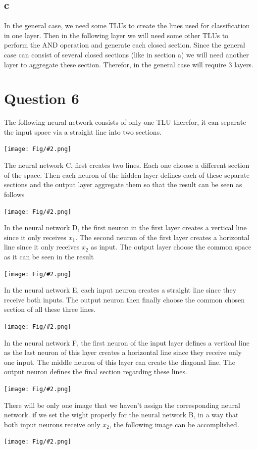 \documentclass[]{article}
\newcommand{\pict}[2]{\begin{center}
		\texttt{[image: Fig/\#2.png]}
\end{center}}
\begin{document}
	\subsection*{c}
	In the general case, we need some TLUs to create the lines used for classification in one layer. Then in the following layer we will need some other TLUs to perform the AND operation and generate each closed section. Since the general case can consist of several closed sections (like in section a) we will need another layer to aggregate these section. Therefor, in the general case will require 3 layers. 
	
	\section{Question 6}
	The following neural network consists of only one TLU therefor, it can separate the input space via a straight line into two sections.
	\pict{0.4}{F6}
	The neural network C, first creates two lines. Each one choose a different section of the space. Then each neuron of the hidden layer  defines each of these separate sections and the output layer aggregate them so that the result can be seen as follows
	\pict{0.4}{F7}
	In the neural network D, the first neuron in the first layer creates a vertical line since it only receives $x_1$. The second neuron of the first layer creates a horizontal line since it only receives $x_2$ as input. The output layer choose the common space as it can be seen in the result
	\pict{0.4}{F8}
	In the neural network E, each input neuron creates a straight line since they receive both inputs. The output neuron then finally choose the common chosen section of all these three lines.
	\pict{0.4}{F9}
	In the neural network F, the first neuron of the input layer defines a vertical line as the last neuron of this layer creates a horizontal line since they receive only one input. The middle neuron of this layer can create the diagonal line. The output neuron defines the final section regarding these lines.
	\pict{0.4}{F10}
	There will be only one image that we haven't assign the corresponding neural network. if we set the wight properly for the neural network B, in a way that both input neurons receive only $x_2$, the following image can be accomplished.
	\pict{0.4}{F11}
	
\end{document}
